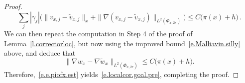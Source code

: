 \documentclass[11pt,twoside]{article} %
\numberwithin{equation}{section}
\theoremstyle{definition}
\let\originalleft\left
\let\originalright\right
\renewcommand{\left}{\mathopen{}\mathclose\bgroup\originalleft}
\renewcommand{\right}{\aftergroup\egroup\originalright}
\renewcommand*{\tilde}{\widetilde}
\newcommand{\A}{\mathcal{A}}
\begin{document}
\begin{proof}
\begin{equation}
\sum_{j} | \gamma_j | \bigl( \| v_{x,j} - \tilde v_{x,j} \|_x  +  \| \nabla (  v_{x,j} - \tilde v_{x,j})   \|_{L^2(\Phi_{x,2r})}   \bigr)
\leq 
C \bigl( \pi(x) + h \bigr)
\,.
\end{equation}
We can then repeat the computation in Step 4 of the proof of  Lemma~\ref{l.correctorloc}, but now using the improved bound~\eqref{e.Malliavin.silly} above, and deduce that 
\begin{equation*}  
\big\| \nabla w_x - \nabla \tilde w_x \big\|_{L^2(\Phi_{x,2r})} 
\leq 
C  \bigl( \pi(x) + h\bigr).
\end{equation*}
Therefore,~\eqref{e.e.piofx.est} yields~\eqref{e.localcor.goal.pre}, completing the proof. 
\end{proof}


%
%
\end{document}
